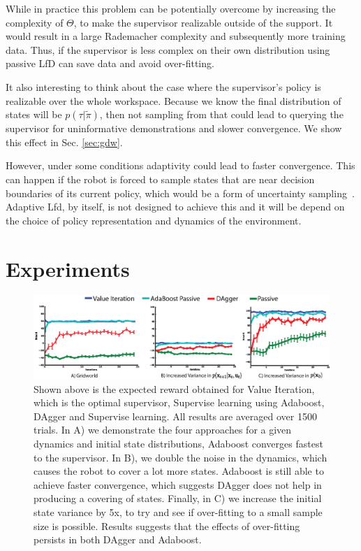 \documentclass[10pt, conference]{ieeeconf}      %
\begin{document}
While in practice this problem can be potentially overcome by increasing the complexity of $\Theta$, to make the supervisor realizable outside of the support. It would result in a large Rademacher complexity and subsequently more training data. Thus, if the supervisor is less complex on their own distribution using passive LfD can save data and avoid over-fitting. 

It also interesting to think about the case where the supervisor's policy is realizable over the whole workspace. Because we know the final distribution of states will be $p(\tau|\tilde{\pi})$, then not sampling from that could lead to querying the supervisor for uninformative demonstrations and slower convergence. We show this effect in Sec. \ref{sec:gdw}. 

However, under some conditions adaptivity could lead to faster convergence.  This can happen if the robot is forced to sample states that are near decision boundaries of its current policy, which would be a form of uncertainty sampling~\cite{settles2008analysis}. Adaptive Lfd, by itself, is not designed to achieve this and it will be depend on the choice of policy representation and dynamics of the environment. 

\section{Experiments}


\begin{figure}
\includegraphics{f_figs/var_grid.eps}
\caption{
    \footnotesize
Shown above is the expected reward obtained for Value Iteration, which is the optimal supervisor, Supervise learning using Adaboost, DAgger and Supervise learning. All results are averaged over 1500 trials. In A) we demonstrate the four approaches for a given dynamics and initial state distributions, Adaboost converges fastest to the supervisor. In B), we double the noise in the dynamics, which causes the robot to cover a lot more states. Adaboost is still able to achieve faster convergence, which suggests DAgger does not help in producing a covering of states. Finally, in C) we increase the initial state variance by 5x, to try and see if over-fitting to a small sample size is possible. Results suggests that the effects of over-fitting persists in both DAgger and Adaboost.}
\vspace*{-20pt}
\label{fig:var}
\end{figure}
\end{document}
